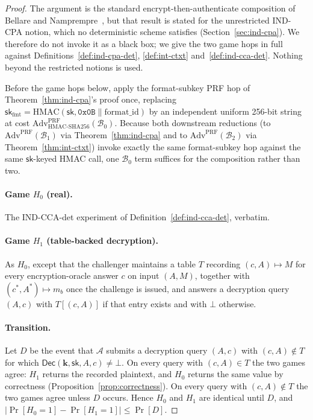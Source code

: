 \documentclass[11pt,a4paper]{article}
\begin{document}
\begin{proof}
The argument is the standard encrypt-then-authenticate composition of
Bellare and Namprempre~\cite{bellare2000ae}, but that result is stated for
the unrestricted IND-CPA notion, which no deterministic scheme satisfies
(Section~\ref{sec:ind-cpa}). We therefore do not invoke it as a black box;
we give the two game hops in full against
Definitions~\ref{def:ind-cpa-det}, \ref{def:int-ctxt}
and~\ref{def:ind-cca-det}. Nothing beyond the restricted notions is used.

Before the game hops below, apply the format-subkey PRF hop of
Theorem~\ref{thm:ind-cpa}'s proof once, replacing
$\mathsf{sk}_{\mathrm{fmt}}=\mathrm{HMAC}(\mathsf{sk},\texttt{0x0B}\|\mathrm{format\_id})$
by an independent uniform 256-bit string at cost
$\mathrm{Adv}^{\mathrm{PRF}}_{\mathrm{HMAC\text{-}SHA256}}(\mathcal{B}_0)$.
Because both downstream reductions (to $\mathrm{Adv}^{\mathrm{PRF}}(\mathcal{B}_1)$
via Theorem~\ref{thm:ind-cpa} and to
$\mathrm{Adv}^{\mathrm{PRF}}(\mathcal{B}_2)$ via
Theorem~\ref{thm:int-ctxt}) invoke exactly the same format-subkey hop
against the same $\mathsf{sk}$-keyed HMAC call, one $\mathcal{B}_0$ term
suffices for the composition rather than two.

\paragraph{Game $H_0$ (real).} The IND-CCA-det experiment of
Definition~\ref{def:ind-cca-det}, verbatim.

\paragraph{Game $H_1$ (table-backed decryption).} As $H_0$, except that the
challenger maintains a table $T$ recording $(c,A)\mapsto M$ for every
encryption-oracle answer $c$ on input $(A,M)$, together with
$(c^*,A^*)\mapsto m_b$ once the challenge is issued, and answers a
decryption query $(A,c)$ with $T[(c,A)]$ if that entry exists and with
$\bot$ otherwise.

\paragraph{Transition.} Let $D$ be the event that $\mathcal{A}$ submits a
decryption query $(A,c)$ with $(c,A)\notin T$ for which
$\mathsf{Dec}(\mathbf{k},\mathsf{sk},A,c)\neq\bot$. On every query with
$(c,A)\in T$ the two games agree: $H_1$ returns the recorded plaintext, and
$H_0$ returns the same value by correctness
(Proposition~\ref{prop:correctness}). On every query with $(c,A)\notin T$
the two games agree unless $D$ occurs. Hence $H_0$ and $H_1$ are identical
until $D$, and $|\Pr[H_0{=}1]-\Pr[H_1{=}1]|\le\Pr[D]$.


\end{proof}
\end{document}

